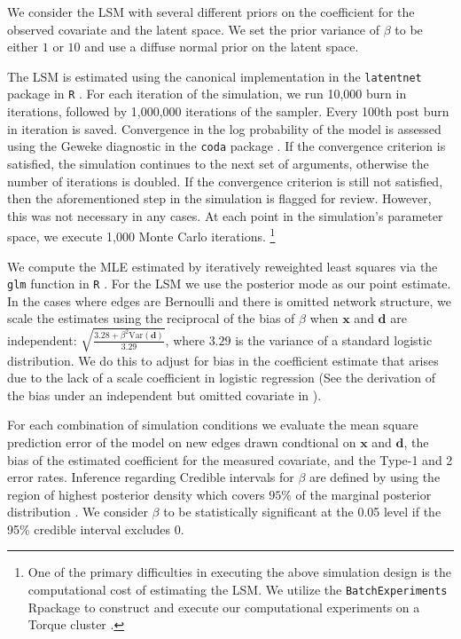 \documentclass[11pt]{article}
\newcommand{\R}{\textsf{R}\space} %
\begin{document}
We consider the LSM with several different priors on the coefficient
for the observed covariate and the latent space. We set the prior
variance of $\beta$ to be either $1$ or $10$ and use a diffuse normal
prior on the latent space.

The LSM is estimated using the canonical implementation in the
\texttt{latentnet} package in \texttt{R} \citep{latentnet}. For each
iteration of the simulation, we run 10,000 burn in iterations,
followed by 1,000,000 iterations of the sampler. Every 100th post burn
in iteration is saved. Convergence in the log probability of the model
is assessed using the Geweke diagnostic in the \texttt{coda} package
\citep{coda, geweke1991evaluating}. If the convergence criterion is
satisfied, the simulation continues to the next set of arguments,
otherwise the number of iterations is doubled. If the convergence
criterion is still not satisfied, then the aforementioned step in the
simulation is flagged for review. However, this was not necessary in
any cases. At each point in the simulation's parameter space, we
execute 1,000 Monte Carlo iterations. \footnote{One of the primary
  difficulties in executing the above simulation design is the
  computational cost of estimating the LSM. We utilize the
  \texttt{BatchExperiments} \R package to construct and execute our
  computational experiments on a Torque cluster
  \cite{bischl2015batchjobs}.}

We compute the MLE estimated by iteratively reweighted least squares
via the \texttt{glm} function in \texttt{R} \citep{rcore}. For the LSM
we use the posterior mode as our point estimate. In the cases where
edges are Bernoulli and there is omitted network structure, we scale
the estimates using the reciprocal of the bias of $\beta$ when
$\mathbf{x}$ and $\mathbf{d}$ are independent: $\sqrt{\frac{3.28 +
    \beta^2 \text{Var}(\mathbf{d})}{3.29}}$, where $3.29$ is the
variance of a standard logistic distribution. We do this to adjust for
bias in the coefficient estimate that arises due to the lack of a
scale coefficient in logistic regression (See the derivation of the
bias under an independent but omitted covariate in
\cite{mood2010logistic}).

For each combination of simulation conditions we evaluate the mean
square prediction error of the model on new edges drawn condtional on
$\mathbf{x}$ and $\mathbf{d}$, the bias of the estimated coefficient
for the measured covariate, and the Type-1 and 2 error
rates. Inference regarding Credible intervals for $\beta$ are defined
by using the region of highest posterior density which covers $95\%$
of the marginal posterior distribution
\cite{turkkan1993computation}. We consider $\beta$ to be statistically
significant at the 0.05 level if the 95\% credible interval excludes
0.
\end{document}
